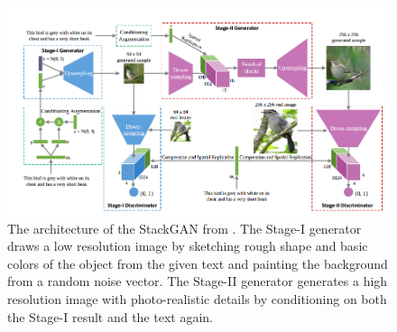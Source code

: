 \documentclass{article}
\begin{document}
\begin{figure}[h]
  \centering
  \includegraphics[scale=0.4]{stackgan.png} 
  \caption{The architecture of the StackGAN from \cite{stackGAN}. The Stage-I generator draws a low resolution image by sketching rough shape and basic colors of the object from the given text and painting the background from a random noise vector. The Stage-II generator generates a high resolution image with photo-realistic details by conditioning on both the Stage-I result and the text again.}
    \label{stackgan}
\end{figure}
\end{document}

